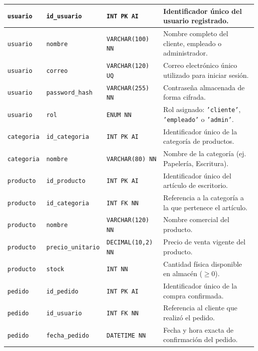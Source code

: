 {\begin{xltabular}{\textwidth}{|>{\raggedright\arraybackslash}p{2.6cm}|>{\raggedright\arraybackslash}p{2.8cm}|>{\raggedright\arraybackslash}p{2.8cm}|X|}
    \texttt{usuario} & \texttt{id\_usuario} & \texttt{INT PK AI} & Identificador único del usuario registrado. \\*
    \hline
    \texttt{usuario} & \texttt{nombre} & \texttt{VARCHAR(100) NN} & Nombre completo del cliente, empleado o administrador. \\*
    \hline
    \texttt{usuario} & \texttt{correo} & \texttt{VARCHAR(120) UQ} & Correo electrónico único utilizado para iniciar sesión. \\*
    \hline
    \texttt{usuario} & \texttt{password\_hash} & \texttt{VARCHAR(255) NN} & Contraseña almacenada de forma cifrada. \\*
    \hline
    \texttt{usuario} & \texttt{rol} & \texttt{ENUM NN} & Rol asignado: \texttt{'cliente'}, \texttt{'empleado'} o \texttt{'admin'}. \\*
    \hline
    \texttt{categoria} & \texttt{id\_categoria} & \texttt{INT PK AI} & Identificador único de la categoría de productos. \\*
    \hline
    \texttt{categoria} & \texttt{nombre} & \texttt{VARCHAR(80) NN} & Nombre de la categoría (ej. Papelería, Escritura). \\*
    \hline
    \texttt{producto} & \texttt{id\_producto} & \texttt{INT PK AI} & Identificador único del artículo de escritorio. \\*
    \hline
    \texttt{producto} & \texttt{id\_categoria} & \texttt{INT FK NN} & Referencia a la categoría a la que pertenece el artículo. \\*
    \hline
    \texttt{producto} & \texttt{nombre} & \texttt{VARCHAR(120) NN} & Nombre comercial del producto. \\*
    \hline
    \texttt{producto} & \texttt{precio\_unitario} & \texttt{DECIMAL(10,2) NN} & Precio de venta vigente del producto. \\*
    \hline
    \texttt{producto} & \texttt{stock} & \texttt{INT NN} & Cantidad física disponible en almacén ($\ge 0$). \\*
    \hline
    \texttt{pedido} & \texttt{id\_pedido} & \texttt{INT PK AI} & Identificador único de la compra confirmada. \\*
    \hline
    \texttt{pedido} & \texttt{id\_usuario} & \texttt{INT FK NN} & Referencia al cliente que realizó el pedido. \\*
    \hline
    \texttt{pedido} & \texttt{fecha\_pedido} & \texttt{DATETIME NN} & Fecha y hora exacta de confirmación del pedido. \\*

\end{xltabular}}
